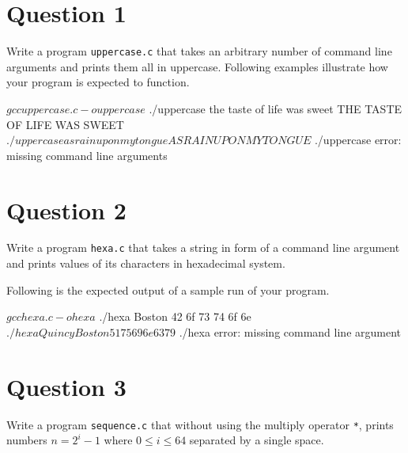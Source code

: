 \documentclass[12pt,letterpaper,twoside]{article}
\begin{document}


\section*{Question 1}

Write a program \texttt{uppercase.c} that takes an arbitrary number of command line arguments and prints them all in uppercase.
Following examples illustrate how your program is expected to function.

\begin{terminal}
$ gcc uppercase.c -o uppercase
$ ./uppercase the taste of life was sweet
THE TASTE OF LIFE WAS SWEET
$ ./uppercase as rain upon my tongue
AS RAIN UPON MY TONGUE
$ ./uppercase
error: missing command line arguments
\end{terminal}

\section*{Question 2}

Write a program \texttt{hexa.c} that takes a string in form of a command line argument and prints values of its characters in hexadecimal system.

Following is the expected output of a sample run of your program.

\begin{terminal}
$ gcc hexa.c -o hexa
$ ./hexa Boston
42 6f 73 74 6f 6e
$ ./hexa Quincy Boston
51 75 69 6e 63 79
$ ./hexa
error: missing command line argument
\end{terminal}

\section*{Question 3}

Write a program \texttt{sequence.c} that without using the multiply operator \texttt{*}, prints numbers $n = 2^{i}-1$ where $0 \leq i \leq 64$ separated by a single space.

\end{document}
